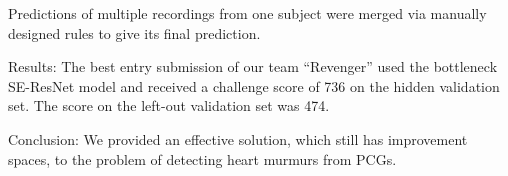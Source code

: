 \documentclass{cinc-abstract}
\begin{document}
Predictions of multiple recordings from one subject were merged via manually designed rules to give its final prediction.

Results: The best entry submission of our team ``Revenger'' used the bottleneck SE-ResNet model and received a challenge score of 736 on the hidden validation set. The score on the left-out validation set was 474.

Conclusion: We provided an effective solution, which still has improvement spaces, to the problem of detecting heart murmurs from PCGs.
\end{document}
